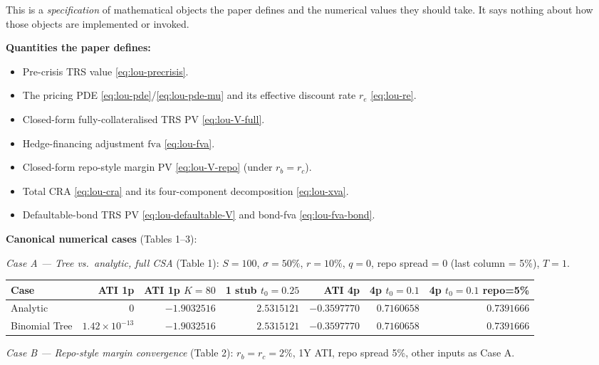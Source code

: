 \documentclass[11pt,a4paper]{article}
\begin{document}
\begin{validation}
This is a \emph{specification} of mathematical objects the paper
defines and the numerical values they should take. It says nothing
about how those objects are implemented or invoked.

\textbf{Quantities the paper defines:}
\begin{itemize}[noitemsep]
  \item Pre-crisis TRS value \eqref{eq:lou-precrisis}.
  \item The pricing PDE \eqref{eq:lou-pde}/\eqref{eq:lou-pde-mu} and
        its effective discount rate $r_e$ \eqref{eq:lou-re}.
  \item Closed-form fully-collateralised TRS PV \eqref{eq:lou-V-full}.
  \item Hedge-financing adjustment $\mathrm{fva}$ \eqref{eq:lou-fva}.
  \item Closed-form repo-style margin PV \eqref{eq:lou-V-repo}
        (under $r_b = r_c$).
  \item Total CRA \eqref{eq:lou-cra} and its four-component
        decomposition \eqref{eq:lou-xva}.
  \item Defaultable-bond TRS PV \eqref{eq:lou-defaultable-V} and
        bond-fva \eqref{eq:lou-fva-bond}.
\end{itemize}

\textbf{Canonical numerical cases} (Tables 1--3):

\smallskip
\textit{Case A --- Tree vs.\ analytic, full CSA} (Table 1):
$S = 100$, $\sigma = 50\%$, $r = 10\%$, $q = 0$, repo spread = 0
(last column = 5\%), $T = 1$.

\smallskip
\begin{tabular}{@{}lrrrrrr@{}}
\toprule
Case                              & ATI 1p        & ATI 1p $K=80$  & 1 stub $t_0=0.25$ & ATI 4p          & 4p $t_0=0.1$     & 4p $t_0=0.1$ repo=5\% \\
\midrule
Analytic                          & $0$           & $-1.9032516$   & $2.5315121$        & $-0.3597770$    & $0.7160658$      & $0.7391666$ \\
Binomial Tree                     & $1.42 \times 10^{-13}$ & $-1.9032516$   & $2.5315121$        & $-0.3597770$    & $0.7160658$      & $0.7391666$ \\
\bottomrule
\end{tabular}
\smallskip

\textit{Case B --- Repo-style margin convergence} (Table 2):
$r_b = r_c = 2\%$, 1Y ATI, repo spread 5\%, other inputs as Case A.


\end{validation}
\end{document}
